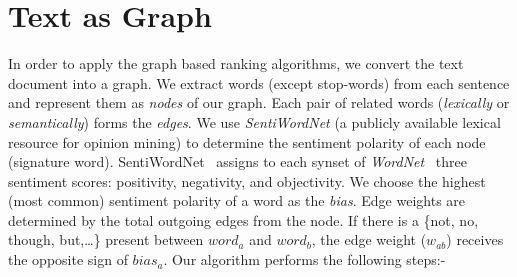 \documentclass[a4paper]{report}
\begin{document}
\section{Text as Graph}
\label{textAsGraph}
In order to apply the graph based ranking algorithms, we convert the text document into a graph.
We extract words (except stop-words) from each sentence and represent them as \emph{nodes} of our graph. 
Each pair of related words ({\em lexically} or {\em semantically}) forms the \emph{edges}.
We use \emph{SentiWordNet} (a publicly available lexical resource for opinion mining) to determine the sentiment polarity of each node (signature word). SentiWordNet~\cite{Esuli06sentiwordnet:a}
assigns to each synset of \emph{WordNet}~\cite{Miller95wordnet:a} three sentiment scores: positivity, negativity, and objectivity. 
We choose the highest (most common) sentiment polarity of a word as the \emph{bias}. Edge weights are determined by the total outgoing edges from the node. If there is a \{not, no, though, but,\dots\} present between $word_a$ and $word_b$, the edge weight ($w_{ab}$) receives the opposite sign of $bias_a$. Our algorithm performs the following steps:- 
\end{document}
